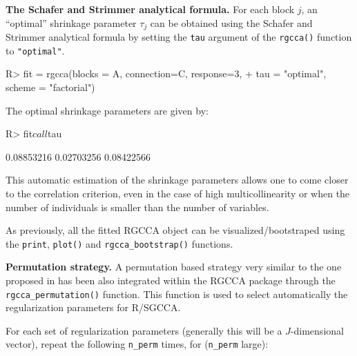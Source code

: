 \documentclass[
]{jss}
\begin{document}
\textbf{The Schafer and Strimmer analytical formula.} For each block
\(j\), an ``optimal'' shrinkage parameter \(\tau_j\) can be obtained
using the Schafer and Strimmer analytical formula \citep{Schafer2005} by
setting the \texttt{tau} argument of the \texttt{rgcca()} function to
\texttt{"optimal"}.

\footnotesize

\begin{CodeChunk}
\begin{CodeInput}
R> fit = rgcca(blocks = A, connection=C, response=3,
+             tau = "optimal", scheme = "factorial")
\end{CodeInput}
\end{CodeChunk}

\normalsize

The optimal shrinkage parameters are given by:

\footnotesize

\begin{CodeChunk}
\begin{CodeInput}
R> fit$call$tau
\end{CodeInput}
\begin{CodeOutput}
[1] 0.08853216 0.02703256 0.08422566
\end{CodeOutput}
\end{CodeChunk}

\normalsize

This automatic estimation of the shrinkage parameters allows one to come
closer to the correlation criterion, even in the case of high
multicollinearity or when the number of individuals is smaller than the
number of variables.

As previously, all the fitted RGCCA object can be visualized/bootstraped
using the \texttt{print}, \texttt{plot()} and
\texttt{rgcca\_bootstrap()} functions.

\textbf{Permutation strategy.} A permutation based strategy very similar
to the one proposed in \citep{Witten2009a} has been also integrated
within the RGCCA package through the \texttt{rgcca\_permutation()}
function. This function is used to select automatically the
regularization parameters for R/SGCCA.

For each set of regularization parameters (generally this will be a
\(J\)-dimensional vector), repeat the following \texttt{n\_perm} times,
for (\texttt{n\_perm} large):
\end{document}
